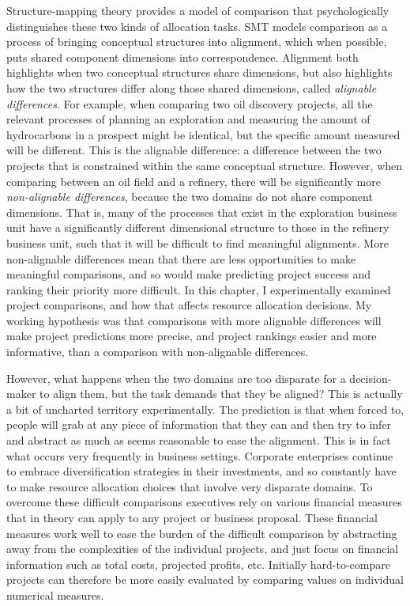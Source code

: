 \documentclass[a4paper, nobind, dvipsnames]{templates/ociamthesis}
\theoremstyle{definition}
\theoremstyle{definition}
\theoremstyle{definition}
\theoremstyle{definition}
\theoremstyle{remark}
\begin{document}
Structure-mapping theory \autocites[SMT;][]{gentner1997,gentner1983} provides a model of
comparison that psychologically distinguishes these two kinds of allocation
tasks. SMT models comparison as a process of bringing conceptual structures into
alignment, which when possible, puts shared component dimensions into
correspondence. Alignment both highlights when two conceptual structures share
dimensions, but also highlights how the two structures differ along those shared
dimensions, called \emph{alignable differences}. For example, when comparing two oil
discovery projects, all the relevant processes of planning an exploration and
measuring the amount of hydrocarbons in a prospect might be identical, but the
specific amount measured will be different. This is the alignable difference: a
difference between the two projects that is constrained within the same
conceptual structure. However, when comparing between an oil field and a
refinery, there will be significantly more \emph{non-alignable differences}, because
the two domains do not share component dimensions. That is, many of the
processes that exist in the exploration business unit have a significantly
different dimensional structure to those in the refinery business unit, such
that it will be difficult to find meaningful alignments. More non-alignable
differences mean that there are less opportunities to make meaningful
comparisons, and so would make predicting project success and ranking their
priority more difficult. In this chapter, I experimentally examined project
comparisons, and how that affects resource allocation decisions. My working
hypothesis was that comparisons with more alignable differences will make
project predictions more precise, and project rankings easier and more
informative, than a comparison with non-alignable differences.

However, what happens when the two domains are too disparate for a
decision-maker to align them, but the task demands that they be aligned? This is
actually a bit of uncharted territory experimentally. The prediction is that
when forced to, people will grab at any piece of information that they can and
then try to infer and abstract as much as seems reasonable to ease the
alignment. This is in fact what occurs very frequently in business settings.
Corporate enterprises continue to embrace diversification strategies in their
investments, and so constantly have to make resource allocation choices that
involve very disparate domains. To overcome these difficult comparisons
executives rely on various financial measures that in theory can apply to any
project or business proposal. These financial measures work well to ease the
burden of the difficult comparison by abstracting away from the complexities of
the individual projects, and just focus on financial information such as total
costs, projected profits, etc. Initially hard-to-compare projects can therefore
be more easily evaluated by comparing values on individual numerical measures.
\end{document}
